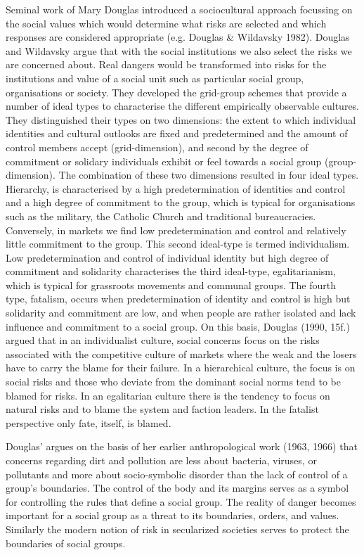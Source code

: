 Seminal work of Mary Douglas introduced a sociocultural approach focussing on the social values which would determine what risks are selected and which responses are considered appropriate (e.g. Douglas \& Wildavsky 1982). Douglas and Wildavsky argue that with the social institutions we also select the risks we are concerned about. Real dangers would be transformed into risks for the institutions and value of a social unit such as particular social group, organisations or society. They developed the grid-group schemes that provide a number of ideal types to characterise the different empirically observable cultures. They distinguished their types on two dimensions: the extent to which individual identities and cultural outlooks are fixed and predetermined and the amount of control members accept (grid-dimension), and second by the degree of commitment or solidary individuals exhibit or feel towards a social group (group-dimension). The combination of these two dimensions resulted in four ideal types. Hierarchy, is characterised by a high predetermination of identities and control and a high degree of commitment to the group, which is typical for organisations such as the military, the Catholic Church and traditional bureaucracies. Conversely, in markets we find low predetermination and control and relatively little commitment to the group. This second ideal-type is termed individualism. Low predetermination and control of individual identity but high degree of commitment and solidarity characterises the third ideal-type, egalitarianism, which is typical for grassroots movements and communal groups. The fourth type, fatalism, occurs when predetermination of identity and control is high but solidarity and commitment are low, and when people are rather isolated and lack influence and commitment to a social group. On this basis, Douglas (1990, 15f.) argued that in an individualist culture, social concerns focus on the risks associated with the competitive culture of markets where the weak and the losers have to carry the blame for their failure. In a hierarchical culture, the focus is on social risks and those who deviate from the dominant social norms tend to be blamed for risks. In an egalitarian culture there is the tendency to focus on natural risks and to blame the system and faction leaders. In the fatalist perspective only fate, itself, is blamed. 

Douglas' argues on the basis of her earlier anthropological work (1963, 1966) that concerns regarding dirt and pollution are less about bacteria, viruses, or pollutants and more about socio-symbolic disorder than the lack of control of a group's boundaries. The control of the body and its margins serves as a symbol for controlling the rules that define a social group. The reality of danger becomes important for a social group as a threat to its boundaries, orders, and values. Similarly the modern notion of risk in secularized societies serves to protect the boundaries of social groups.

